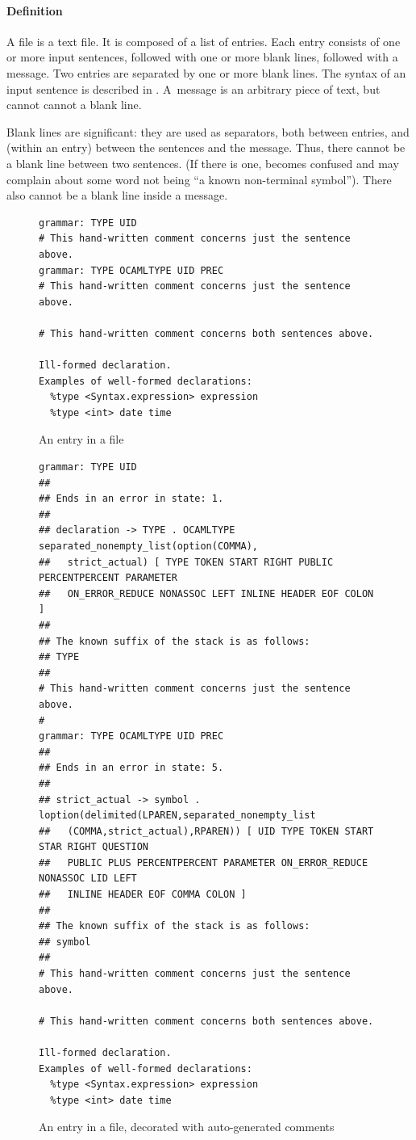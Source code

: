 \documentclass[onecolumn,11pt,nocopyrightspace,preprint]{sigplanconf}
\begin{document}
\paragraph{Definition}

A \messages file is a text file. It is composed of a list of entries. Each
entry consists of one or more input sentences, followed with one or more blank
lines, followed with a message. Two entries are separated by one or more blank
lines. The syntax of an input sentence is described in .
A~message is an arbitrary piece of text, but cannot cannot a blank line.

Blank lines are significant: they are used as separators, both between
entries, and (within an entry) between the sentences and the message. Thus,
there cannot be a blank line between two sentences. (If there is one, \menhir
becomes confused and may complain about some word not being ``a known
non-terminal symbol''). There also cannot be a blank line inside a message.

\begin{figure}
\begin{verbatim}
grammar: TYPE UID
# This hand-written comment concerns just the sentence above.
grammar: TYPE OCAMLTYPE UID PREC
# This hand-written comment concerns just the sentence above.

# This hand-written comment concerns both sentences above.

Ill-formed declaration.
Examples of well-formed declarations:
  %type <Syntax.expression> expression
  %type <int> date time
\end{verbatim}
\caption{An entry in a \messages file}
\label{fig:messages:entry}
\end{figure}

\begin{figure}
\begin{verbatim}
grammar: TYPE UID
##
## Ends in an error in state: 1.
##
## declaration -> TYPE . OCAMLTYPE separated_nonempty_list(option(COMMA),
##   strict_actual) [ TYPE TOKEN START RIGHT PUBLIC PERCENTPERCENT PARAMETER
##   ON_ERROR_REDUCE NONASSOC LEFT INLINE HEADER EOF COLON ]
##
## The known suffix of the stack is as follows:
## TYPE
##
# This hand-written comment concerns just the sentence above.
#
grammar: TYPE OCAMLTYPE UID PREC
##
## Ends in an error in state: 5.
##
## strict_actual -> symbol . loption(delimited(LPAREN,separated_nonempty_list
##   (COMMA,strict_actual),RPAREN)) [ UID TYPE TOKEN START STAR RIGHT QUESTION
##   PUBLIC PLUS PERCENTPERCENT PARAMETER ON_ERROR_REDUCE NONASSOC LID LEFT
##   INLINE HEADER EOF COMMA COLON ]
##
## The known suffix of the stack is as follows:
## symbol
##
# This hand-written comment concerns just the sentence above.

# This hand-written comment concerns both sentences above.

Ill-formed declaration.
Examples of well-formed declarations:
  %type <Syntax.expression> expression
  %type <int> date time
\end{verbatim}
\caption{An entry in a \messages file, decorated with auto-generated comments}
\label{fig:messages:entry:decorated}
\end{figure}
\end{document}
